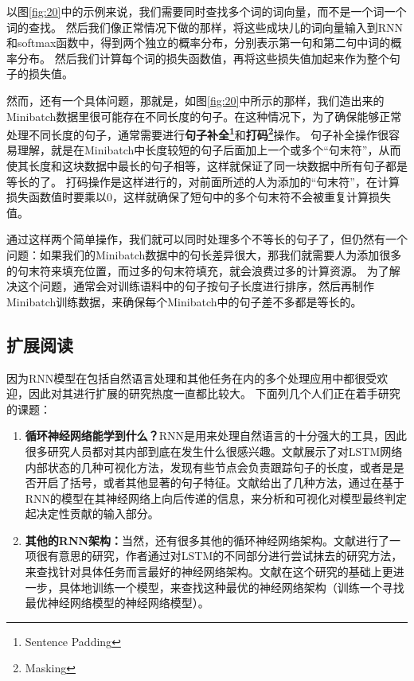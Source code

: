 \documentclass[10pt,a4paper]{ctexart}
\begin{document}
以图\ref{fig:20}中的示例来说，我们需要同时查找多个词的词向量，而不是一个词一个词的查找。
然后我们像正常情况下做的那样，将这些成块儿的词向量输入到RNN和softmax函数中，得到两个独立的概率分布，分别表示第一句和第二句中词的概率分布。
然后我们计算每个词的损失函数值，再将这些损失值加起来作为整个句子的损失值。

然而，还有一个具体问题，那就是，如图\ref{fig:20}中所示的那样，我们造出来的Minibatch数据里很可能存在不同长度的句子。在这种情况下，为了确保能够正常处理不同长度的句子，通常需要进行\textbf{句子补全\footnote{Sentence Padding}}和\textbf{打码\footnote{Masking}}操作。
句子补全操作很容易理解，就是在Minibatch中长度较短的句子后面加上一个或多个“句末符”，从而使其长度和这块数据中最长的句子相等，这样就保证了同一块数据中所有句子都是等长的了。
打码操作是这样进行的，对前面所述的人为添加的“句末符”，在计算损失函数值时要乘以0，这样就确保了短句中的多个句末符不会被重复计算损失值。

通过这样两个简单操作，我们就可以同时处理多个不等长的句子了，但仍然有一个问题：如果我们的Minibatch数据中的句长差异很大，那我们就需要人为添加很多的句末符来填充位置，而过多的句末符填充，就会浪费过多的计算资源。
为了解决这个问题，通常会对训练语料中的句子按句子长度进行排序，然后再制作Minibatch训练数据，来确保每个Minibatch中的句子差不多都是等长的。

\newpage
\subsection{扩展阅读}
因为RNN模型在包括自然语言处理和其他任务在内的多个处理应用中都很受欢迎，因此对其进行扩展的研究热度一直都比较大。
下面列几个人们正在着手研究的课题：
\begin{enumerate}
\item[] \textbf{循环神经网络能学到什么？}RNN是用来处理自然语言的十分强大的工具，因此很多研究人员都对其内部到底在发生什么很感兴趣。文献\cite{karpathy2015visualizing}展示了对LSTM网络内部状态的几种可视化方法，发现有些节点会负责跟踪句子的长度，或者是是否开启了括号，或者其他显著的句子特征。文献\cite{li2015visualizing}给出了几种方法，通过在基于RNN的模型在其神经网络上向后传递的信息，来分析和可视化对模型最终判定起决定性贡献的输入部分。
\item[] \textbf{其他的RNN架构：}当然，还有很多其他的循环神经网络架构。文献\cite{greff2016lstm}进行了一项很有意思的研究，作者通过对LSTM的不同部分进行尝试抹去的研究方法，来查找针对具体任务而言最好的神经网络架构。文献\cite{zoph2016neural}在这个研究的基础上更进一步，具体地训练一个模型，来查找这种最优的神经网络架构（训练一个寻找最优神经网络模型的神经网络模型）。
\end{enumerate}
\end{document}
